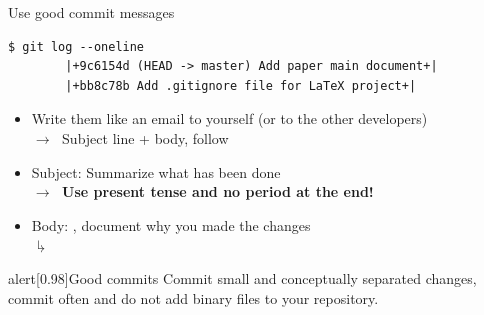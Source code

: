 \documentclass[usenames,svgnames,14pt]{beamer}
\begin{document}
\begin{frame}[fragile]{Use good commit messages}
    \begin{lstlisting}[style=MyBash]
        $ git log --oneline
        |+9c6154d (HEAD -> master) Add paper main document+|
        |+bb8c78b Add .gitignore file for LaTeX project+|
    \end{lstlisting}
    \vspace{1mm}
    \begin{itemize}
        \item Write them like an email to yourself (or to the other developers)\\
              $\to\;$ Subject line + body, follow 
        \item Subject: Summarize what has been done\\
              $\to\;$ \alert{\textbf{Use present tense and no period at the end!}}
        \item Body: , document why you made the changes\\[-0.5ex]
              \phantom{Bo}$\drsh$
    \end{itemize}
    \begin{varblock}{alert}[0.98\textwidth]{Good commits}
        Commit small and conceptually separated changes, commit often and do not add binary files to your repository.
    \end{varblock}
\end{frame}
\end{document}
